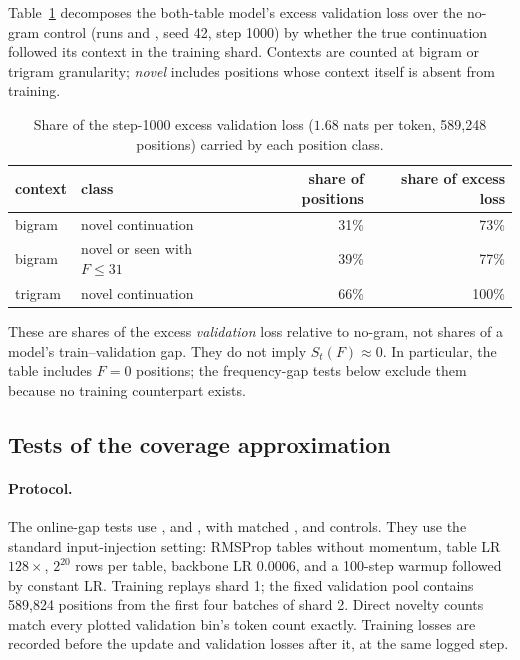 Table~\ref{tab:novel-share} decomposes the both-table model's excess validation loss over the no-gram control (runs  and , seed 42, step 1000) by whether the true continuation followed its context in the training shard. Contexts are counted at bigram or trigram granularity; \emph{novel} includes positions whose context itself is absent from training.

\begin{table}[!htbp]
\centering\small
\caption{Share of the step-1000 excess validation loss ($1.68$ nats per token, 589{,}248 positions) carried by each position class.}
\label{tab:novel-share}
\begin{tabular}{llrr}
\toprule
context & class & share of positions & share of excess loss \\
\midrule
bigram & novel continuation & 31\% & 73\% \\
bigram & novel or seen with $F\le 31$ & 39\% & 77\% \\
trigram & novel continuation & 66\% & 100\% \\
\bottomrule
\end{tabular}
\end{table}

These are shares of the excess \emph{validation} loss relative to no-gram, not shares of a model's train--validation gap. They do not imply $S_t(F)\approx0$. In particular, the table includes $F=0$ positions; the frequency-gap tests below exclude them because no training counterpart exists.

\subsection{Tests of the coverage approximation}
\label{app:coverage-tests}
\label{app:gt-fits}
\paragraph{Protocol.}
The online-gap tests use ,  and , with matched ,  and  controls. They use the standard input-injection setting: RMSProp tables without momentum, table LR $128\times$, $2^{20}$ rows per table, backbone LR $0.0006$, and a 100-step warmup followed by constant LR. Training replays shard 1; the fixed validation pool contains 589,824 positions from the first four batches of shard 2. Direct novelty counts match every plotted validation bin's token count exactly. Training losses are recorded before the update and validation losses after it, at the same logged step.

